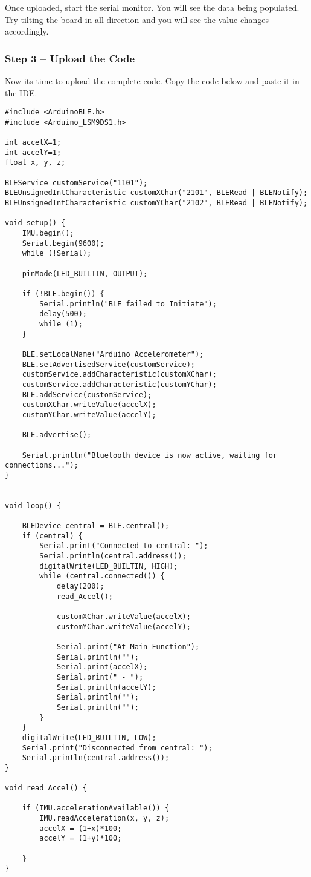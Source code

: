 Once uploaded, start the serial monitor. You will see the data being populated. Try tilting the board in all direction and you will see the value changes accordingly.

\subsubsection{Step 3 -- Upload the Code}

Now its time to upload the complete code. Copy the code below and paste it in the IDE.

\begin{lstlisting}
#include <ArduinoBLE.h>
#include <Arduino_LSM9DS1.h>

int accelX=1;
int accelY=1;
float x, y, z;

BLEService customService("1101");
BLEUnsignedIntCharacteristic customXChar("2101", BLERead | BLENotify);
BLEUnsignedIntCharacteristic customYChar("2102", BLERead | BLENotify);

void setup() {
    IMU.begin();
    Serial.begin(9600); 
    while (!Serial);
    
    pinMode(LED_BUILTIN, OUTPUT);
    
    if (!BLE.begin()) {
        Serial.println("BLE failed to Initiate");
        delay(500);
        while (1);
    }
    
    BLE.setLocalName("Arduino Accelerometer");
    BLE.setAdvertisedService(customService);
    customService.addCharacteristic(customXChar);
    customService.addCharacteristic(customYChar);
    BLE.addService(customService);
    customXChar.writeValue(accelX);
    customYChar.writeValue(accelY);
    
    BLE.advertise();
    
    Serial.println("Bluetooth device is now active, waiting for connections...");
}


void loop() {
    
    BLEDevice central = BLE.central();
    if (central) {
        Serial.print("Connected to central: ");
        Serial.println(central.address());
        digitalWrite(LED_BUILTIN, HIGH);
        while (central.connected()) {
            delay(200);
            read_Accel();
            
            customXChar.writeValue(accelX);
            customYChar.writeValue(accelY);
            
            Serial.print("At Main Function");
            Serial.println("");
            Serial.print(accelX);
            Serial.print(" - ");
            Serial.println(accelY);
            Serial.println("");
            Serial.println("");
        }
    }
    digitalWrite(LED_BUILTIN, LOW);
    Serial.print("Disconnected from central: ");
    Serial.println(central.address());
}

void read_Accel() {
    
    if (IMU.accelerationAvailable()) {
        IMU.readAcceleration(x, y, z);
        accelX = (1+x)*100;
        accelY = (1+y)*100;
        
    }
}
\end{lstlisting}

